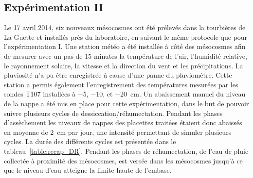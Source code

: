 \subsection{Expérimentation II}
Le 17 avril 2014, six nouveaux mésocosmes ont été prélevés dans la tourbières de La Guette et installés près du laboratoire, en suivant le même protocole que pour l'expérimentation I.
Une station météo a été installée à côté des mésocosmes afin de mesurer avec un pas de 15 minutes la température de l'air, l'humidité relative, le rayonnement solaire, la vitesse et la direction du vent et les précipitations.
La pluviosité n'a pu être enregistrée à cause d'une panne du pluviomètre.
Cette station a permis également l'enregistrement des températures mesurées par les sondes T107 installées à \num{-5}, \num{-10}, et \SI{-20}{\centi\metre}.
Un abaissement manuel du niveau de la nappe a été mis en place pour cette expérimentation, dans le but de pouvoir suivre plusieurs cycles de dessiccation/réhumectation.
Pendant les phases d'assèchement les niveaux de nappes des placettes traitées étaient donc abaissés en moyenne de \SI{2}{\centi\metre} par jour, une intensité permettant de simuler plusieurs cycles.
La durée des différents cycles est présentée dans le tableau~\ref{table:recap_DR}.
Pendant les phases de réhumectation, de l'eau de pluie collectée à proximité des mésocosmes, est versée dans les mésocosmes jusqu'à ce que le niveau d'eau atteigne la limite haute de l'embase. 












